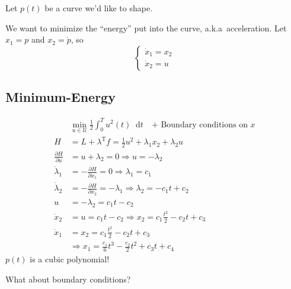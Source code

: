 \documentclass[letterpaper,12pt,titlepage]{report}
\newcommand*\dif{\mathop{}\!\mathrm{d}}
\newcommand{\trans}{^\text{T}}
\newcommand*\pder[2]{\frac{\partial #1}{\partial #2}}
\theoremstyle{plain}
\theoremstyle{definition}
\begin{document}
Let $p(t)$ be a curve we'd like to shape.
\begin{center}
\end{center}
We want to minimize the ``energy'' put into the curve, a.k.a\ acceleration.
Let $x_1=p$ and $x_2=\dot p$, so
\[ \begin{cases}
    \dot x_1 = x_2 \\
    \dot x_2 = u
  \end{cases} \]

\subsection{Minimum-Energy}

\begin{align}
  & \min_{u\in\mathcal U} \frac{1}{2} \int_0^T u^2(t)\dif t \quad \text{+ Boundary conditions on $x$} \\
  H &= L+\lambda\trans f = \frac12 u^2 + \lambda_1 x_2 + \lambda_2 u \\
  \pder{H}{u} &= u + \lambda_2 = 0 \Longrightarrow u = -\lambda_2 \\
  \dot\lambda_1 &= -\pder{H}{x_1} = 0 \Longrightarrow \lambda_1 = c_1 \\
  \dot\lambda_2 &= -\pder{H}{x_2} = -\lambda_1 \Longrightarrow \lambda_2 = -c_1t+c_2 \\
  u &= -\lambda_2 = c_1t-c_2 \\
  \dot x_2 &= u = c_1t-c_2 \Longrightarrow x_2 = c_1 \frac{t^2}{2} - c_2t + c_3 \\
  \dot x_1 &= x_2 = c_1\frac{t^2}{2} -c_2t + c_3 \\
  & \Longrightarrow x_1 = \frac{c_1}{6}t^3 - \frac{c_2}{2}t^2 + c_3 t + c_4
\end{align}
$p(t)$ is a cubic polynomial!

\medskip \noindent
What about boundary conditions?
\end{document}
